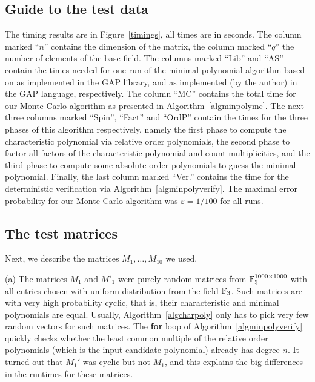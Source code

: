 \subsection{Guide to the test data}
The timing results
are in Figure~\ref{timings}, all times are in seconds. 
The column marked ``$n$'' contains the
dimension of the matrix, the column marked ``$q$'' the number of elements
of the base field. 
The columns marked ``Lib'' and ``AS'' contain the times needed for one run of 
the minimal polynomial algorithm based on \cite{Steel} as implemented in 
the {\sf GAP} library, and as implemented (by the author) in the
{\sf GAP} language, respectively.
The column ``MC'' contains the total time for our 
Monte Carlo algorithm as presented in Algorithm~\ref{algminpolymc}.
The next three columns marked ``Spin'', ``Fact'' and ``OrdP''
contain the times for the three phases of this algorithm respectively, 
namely the first phase to compute the characteristic polynomial via
relative order polynomials, the second phase to factor all factors of
the characteristic polynomial and count multiplicities, and the third
phase to compute some absolute order polynomials to guess the minimal
polynomial. Finally, the last column marked ``Ver.'' contains
the time for the deterministic verification via 
%
Algorithm~\ref{algminpolyverify}.
The maximal error probability for our Monte Carlo algorithm was
$\varepsilon = 1/100$ for all runs.


\subsection{The test matrices}
Next, we describe the matrices $M_1, \ldots, M_{10}$ we used.

(a) \quad The matrices $M_1$ and $M'_1$ were purely random matrices from
$\mathbb{F}_3^{1000\times 1000}$ with all entries
chosen with uniform distribution from the field $\mathbb{F}_3$. Such matrices
are with very high probability cyclic, that is, their characteristic and
minimal polynomials are equal. Usually, Algorithm~\ref{algcharpoly} only
has to pick very few random vectors for such matrices. The {\bf for} loop
of Algorithm~\ref{algminpolyverify} quickly checks whether the least common multiple
of the relative order polynomials (which is the input candidate polynomial)
already has degree $n$. It turned out that $M_1'$ was cyclic but not $M_1$, 
and this explains the
big differences in the runtimes for these matrices.


